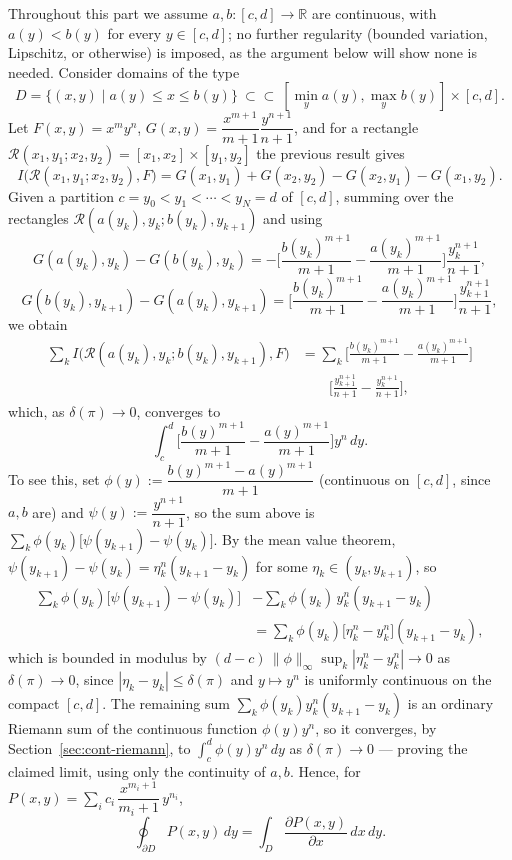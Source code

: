 \documentclass[11pt,fleqn]{article}
\def\R{\mathbb R}
\theoremstyle{plain}
\theoremstyle{remark}
\begin{document}
Throughout this part we assume $a,b\colon[c,d]\to\R$ are continuous, with
$a(y)<b(y)$ for every $y\in[c,d]$; no further regularity (bounded
variation, Lipschitz, or otherwise) is imposed, as the argument below
will show none is needed. Consider domains of the type
\[
D=\{(x,y)\mid a(y)\le x\le b(y)\}\ \subset\subset\ [\min_ya(y),\max_yb(y)]\times[c,d].
\]
Let $F(x,y)=x^my^n$, $G(x,y)=\dfrac{x^{m+1}}{m+1}\dfrac{y^{n+1}}{n+1}$, and
for a rectangle $\mathcal R(x_1,y_1;x_2,y_2)=[x_1,x_2]\times[y_1,y_2]$ the
previous result gives
\[
I\big(\mathcal R(x_1,y_1;x_2,y_2),F\big)=G(x_1,y_1)+G(x_2,y_2)-G(x_2,y_1)-G(x_1,y_2).
\]
Given a partition $c=y_0<y_1<\cdots<y_N=d$ of $[c,d]$, summing over the
rectangles $\mathcal R(a(y_k),y_k;b(y_k),y_{k+1})$ and using
\[
G(a(y_k),y_k)-G(b(y_k),y_k)=-\Big[\frac{b(y_k)^{m+1}}{m+1}-\frac{a(y_k)^{m+1}}{m+1}\Big]\frac{y_k^{n+1}}{n+1},
\]
\[
G(b(y_k),y_{k+1})-G(a(y_k),y_{k+1})=\Big[\frac{b(y_k)^{m+1}}{m+1}-\frac{a(y_k)^{m+1}}{m+1}\Big]\frac{y_{k+1}^{n+1}}{n+1},
\]
we obtain
\begin{align*}
\sum_k I\big(\mathcal R(a(y_k),y_k;b(y_k),y_{k+1}),F\big)
&=\sum_k\Big[\frac{b(y_k)^{m+1}}{m+1}-\frac{a(y_k)^{m+1}}{m+1}\Big]\\
&\qquad\Big[\frac{y_{k+1}^{n+1}}{n+1}-\frac{y_k^{n+1}}{n+1}\Big],
\end{align*}
which, as $\delta(\pi)\to0$, converges to
\[
\int_c^d\Big[\frac{b(y)^{m+1}}{m+1}-\frac{a(y)^{m+1}}{m+1}\Big]y^n\,dy.
\]
To see this, set $\phi(y):=\dfrac{b(y)^{m+1}-a(y)^{m+1}}{m+1}$ (continuous
on $[c,d]$, since $a,b$ are) and $\psi(y):=\dfrac{y^{n+1}}{n+1}$, so the
sum above is $\sum_k\phi(y_k)\big[\psi(y_{k+1})-\psi(y_k)\big]$. By the
mean value theorem, $\psi(y_{k+1})-\psi(y_k)=\eta_k^n(y_{k+1}-y_k)$ for
some $\eta_k\in(y_k,y_{k+1})$, so
\begin{align*}
\sum_k\phi(y_k)\big[\psi(y_{k+1})-\psi(y_k)\big]&-\sum_k\phi(y_k)\,y_k^n(y_{k+1}-y_k)\\
&=\sum_k\phi(y_k)\big[\eta_k^n-y_k^n\big](y_{k+1}-y_k),
\end{align*}
which is bounded in modulus by
$(d-c)\,\|\phi\|_\infty\sup_k|\eta_k^n-y_k^n|\to0$ as $\delta(\pi)\to0$,
since $|\eta_k-y_k|\le\delta(\pi)$ and $y\mapsto y^n$ is uniformly
continuous on the compact $[c,d]$. The remaining sum
$\sum_k\phi(y_k)y_k^n(y_{k+1}-y_k)$ is an ordinary Riemann sum of the
continuous function $\phi(y)y^n$, so it converges, by
Section~\ref{sec:cont-riemann}, to $\int_c^d\phi(y)y^n\,dy$ as
$\delta(\pi)\to0$ --- proving the claimed limit, using only the
continuity of $a,b$.
Hence, for $P(x,y)=\sum_ic_i\,\dfrac{x^{m_i+1}}{m_i+1}\,y^{n_i}$,
\[
\oint_{\partial D}P(x,y)\,dy=\int_D\frac{\partial P(x,y)}{\partial x}\,dx\,dy.
\]
\end{document}
